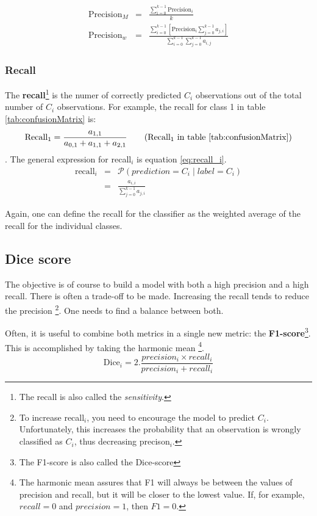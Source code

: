 \begin{eqnarray}
    \text{Precision}_M &=& \frac{\sum_{i=0}^{k-1} \text{Precision}_i}{k}  \\
    \text{Precision}_w &=& \frac{\sum_{i=0}^{k-1} \left[ \text{Precision}_i \sum_{j=0}^{k-1} a_{j,i} \right] }{\sum_{i=0}^{k-1} \sum_{j=0}^{k-1} a_{i,j} }  
\end{eqnarray}


\subsubsection{Recall}

The \textbf{recall}\footnote{The recall is also called the \textit{sensitivity}.} is the numer of correctly predicted $C_i$ observations out of the total number of $C_i$ observations.
For example, the recall for class 1 in table \ref{tab:confusionMatrix} is:
\begin{equation}
    \text{Recall}_1 = \frac{a_{1,1}}{a_{0,1} + a_{1,1} + a_{2, 1}} \tag{Recall$_1$ in table \ref{tab:confusionMatrix}}
\end{equation}.
The general expression for recall$_i$ is equation \ref{eq:recall_i}.
\begin{eqnarray}
    \text{recall}_i &=& \mathcal{P} \left( prediction = C_i \mid label = C_i \right) \\
    &=& \frac{a_{i, i}}{\sum_{j=0}^{k-1} a_{j, i}} \label{eq:recall_i}
\end{eqnarray}

Again, one can define the recall for the classifier as the weighted average of the recall for the individual classes.

\subsection{Dice score\label{sec:dice}}

The objective is of course to build a model with both a high precision and a high recall.
There is often a trade-off to be made. 
Increasing the recall tends to reduce the precision
\footnote{To increase recall$_i$, you need to encourage the model to predict $C_i$. Unfortunately, this increases the probability that an observation is wrongly classified as $C_i$, thus decreasing precison$_i$.}.
One needs to find a balance between both.

Often, it is useful to combine both metrics in a single new metric: the \textbf{F1-score}\footnote{The F1-score is also called the Dice-score}. This is accomplished by taking the harmonic mean
\footnote{The harmonic mean assures that F1 will always be between the values of precision and recall, but it will be closer to the lowest value. If, for example, $recall=0$ and $precision=1$, then $F1=0$.}.
\begin{equation}
    \text{Dice}_i = 2 . \frac{precision_i \times recall_i }{precision_i + recall_i }
\end{equation}

